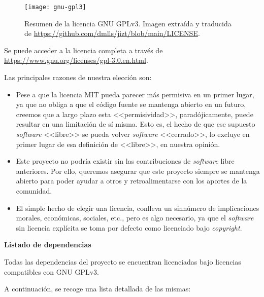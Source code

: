 \begin{figure}[h]
	\centering
	\texttt{[image: gnu-gpl3]}
	\vspace{-0.5cm}
	\caption[Resumen de la licencia GNU GPLv3]{Resumen de la licencia GNU GPLv3. Imagen extraída y traducida de \href{https://github.com/dmlls/jizt/blob/main/LICENSE}{https://github.com/dmlls/jizt/blob/main/LICENSE}.}
	\label{gnu-gpl3}
\end{figure}

Se puede acceder a la licencia completa a través de \href{https://www.gnu.org/licenses/gpl-3.0.en.html}{https://www.gnu.org/\newline licenses/gpl-3.0.en.html}.

Las principales razones de nuestra elección son:

\vspace{-0.3cm}
\begin{itemize}[\textbullet]
	\item Pese a que la licencia MIT pueda parecer más permisiva en un primer lugar, ya que no obliga a que el código fuente se mantenga abierto en un futuro, creemos que a largo plazo esta <<permisividad>>, paradójicamente, puede resultar en una limitación de sí misma. Esto es, el hecho de que ese supuesto \emph{software} <<libre>> se pueda volver \emph{software} <<cerrado>>, lo excluye en primer lugar de esa definición de <<libre>>, en nuestra opinión.

	\item Este proyecto no podría existir sin las contribuciones de \emph{software} libre anteriores. Por ello, queremos asegurar que este proyecto siempre se mantenga abierto para poder ayudar a otros y retroalimentarse con los aportes de la comunidad.
	
	\item El simple hecho de elegir una licencia, conlleva un sinnúmero de implicaciones morales, económicas, sociales, etc., pero es algo necesario, ya que el \emph{software} sin licencia explícita se toma por defecto como licenciado bajo \emph{copyright}.
\end{itemize}

\newpage

\noindent
\textbf{Listado de dependencias}

Todas las dependencias del proyecto se encuentran licenciadas bajo licencias compatibles con GNU GPLv3.

A continuación, se recoge una lista detallada de las mismas:

